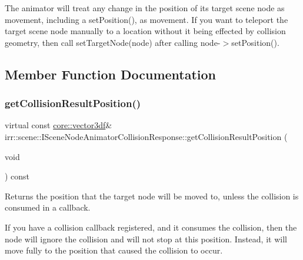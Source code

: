 The animator will treat any change in the position of its target scene node as movement, including a set\+Position(), as movement. If you want to teleport the target scene node manually to a location without it being effected by collision geometry, then call set\+Target\+Node(node) after calling node-\/$>$set\+Position(). 

\subsection{Member Function Documentation}
\mbox{\label{classirr_1_1scene_1_1ISceneNodeAnimatorCollisionResponse_a788542083dda874c63e278891535a9f4}} 
\subsubsection{\texorpdfstring{get\+Collision\+Result\+Position()}{getCollisionResultPosition()}\hspace{0.1cm}{\footnotesize\ttfamily [1/2]}}
{\footnotesize\ttfamily virtual const \hyperlink{namespaceirr_1_1core_ae6e2b2a6c552833ebbd5b7463d03586b}{core\+::vector3df}\& irr\+::scene\+::\+I\+Scene\+Node\+Animator\+Collision\+Response\+::get\+Collision\+Result\+Position (\begin{DoxyParamCaption}\item[{void}]{ }\end{DoxyParamCaption}) const\hspace{0.3cm}{\ttfamily [pure virtual]}}



Returns the position that the target node will be moved to, unless the collision is consumed in a callback. 

If you have a collision callback registered, and it consumes the collision, then the node will ignore the collision and will not stop at this position. Instead, it will move fully to the position that caused the collision to occur. \mbox{\label{classirr_1_1scene_1_1ISceneNodeAnimatorCollisionResponse_a788542083dda874c63e278891535a9f4}} 
